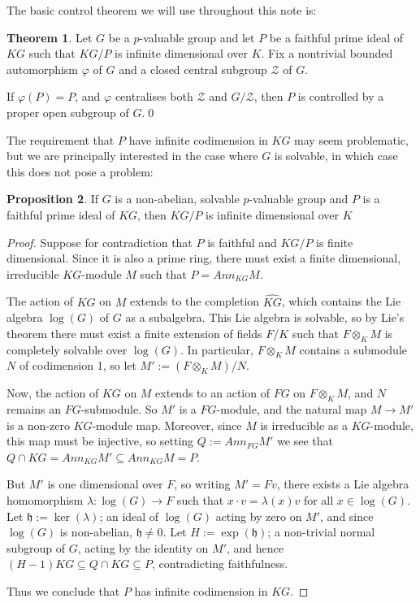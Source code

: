 \documentclass[12pt,a4paper]{article}
\theoremstyle{definition}
\newtheorem{thm}{Theorem}[section]
\newtheorem{propn}[thm]{Proposition}
\theoremstyle{remark}
\theoremstyle{custthm}
\begin{document}

The basic control theorem we will use throughout this note is:

\begin{thm}\label{thm: control theorem using bounded automorphisms}
\cite[Theorem 3.16]{jones-primitive-ideals} Let $G$ be a $p$-valuable group and let $P$ be a faithful prime ideal of $KG$ such that $KG/P$ is infinite dimensional over $K$. Fix a nontrivial bounded automorphism $\varphi$ of $G$ and a closed central subgroup $\mathcal{Z}$ of $G$. 

If $\varphi(P) = P$, and $\varphi$ centralises both $\mathcal{Z}$ and $G/\mathcal{Z}$, then $P$ is controlled by a proper open subgroup of $G$.\qed
\end{thm}

The requirement that $P$ have infinite codimension in $KG$ may seem problematic, but we are principally interested in the case where $G$ is solvable, in which case this does not pose a problem:

\begin{propn}\label{propn: infinite codimension}
If $G$ is a non-abelian, solvable $p$-valuable group and $P$ is a faithful prime ideal of $KG$, then $KG/P$ is infinite dimensional over $K$
\end{propn}

\begin{proof}
Suppose for contradiction that $P$ is faithful and $KG/P$ is finite dimensional. Since it is also a prime ring, there must exist a finite dimensional, irreducible $KG$-module $M$ such that $P=Ann_{KG}M$.

The action of $KG$ on $M$ extends to the completion $\widehat{KG}$, which contains the Lie algebra $\log(G)$ of $G$ as a subalgebra. This Lie algebra is solvable, so by Lie's theorem there must exist a finite extension of fields $F/K$ such that $F\otimes_K M$ is completely solvable over $\log(G)$. In particular, $F\otimes_K M$ contains a submodule $N$ of codimension 1, so let $M':=(F\otimes_K M)/N$.

Now, the action of $KG$ on $M$ extends to an action of $FG$ on $F\otimes_K M$, and $N$ remains an $FG$-submodule. So $M'$ is a $FG$-module, and the natural map $M\to M'$ is a non-zero $KG$-module map. Moreover, since $M$ is irreducible as a $KG$-module, this map must be injective, so setting $Q:=Ann_{FG}M'$ we see that $Q\cap KG=Ann_{KG}M'\subseteq Ann_{KG} M=P$.

But $M'$ is one dimensional over $F$, so writing $M'=Fv$, there exists a Lie algebra homomorphism $\lambda:\log(G)\to F$ such that $x\cdot v=\lambda(x)v$ for all $x\in\log(G)$. Let $\mathfrak{h}:=\ker(\lambda)$; an ideal of $\log(G)$ acting by zero on $M'$, and since $\log(G)$ is non-abelian, $\mathfrak{h}\neq 0$. Let $H:=\exp(\mathfrak{h})$; a non-trivial normal subgroup of $G$, acting by the identity on $M'$, and hence $(H-1)KG\subseteq Q\cap KG\subseteq P$, contradicting faithfulness.

Thus we conclude that $P$ has infinite codimension in $KG$.\end{proof}
\end{document}
